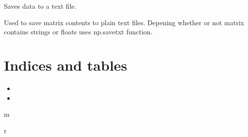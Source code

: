 \documentclass[letterpaper,10pt,english]{sphinxmanual}
\begin{document}

\begin{fulllineitems}
\label{\detokenize{code:mainGUI.savetxt}}
Saves data to a text file.

Used to save matrix contents to plain text files. 
Depening whether or not matrix contains strings or floats
uses np.savetxt function.

\end{fulllineitems}



\chapter{Indices and tables}
\label{\detokenize{index:indices-and-tables}}\begin{itemize}
\item {} 

\item {} 

\end{itemize}


\renewcommand{\indexname}{Python Module Index}
\begin{sphinxtheindex}
\def\bigletter#1{{\Large\sffamily#1}\nopagebreak\vspace{1mm}}
\bigletter{m}
\item {}
\indexspace
\bigletter{r}
\item {}
\end{sphinxtheindex}

\renewcommand{\indexname}{Index}
\printindex
\end{document}
